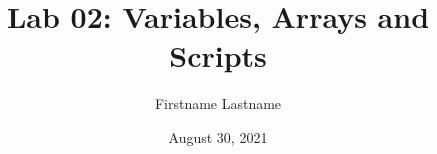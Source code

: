 \newcommand{\course}{MATH 3341}
\title{Lab 02: Variables, Arrays and Scripts}
\author{Firstname Lastname}
\date{August 30, 2021}
